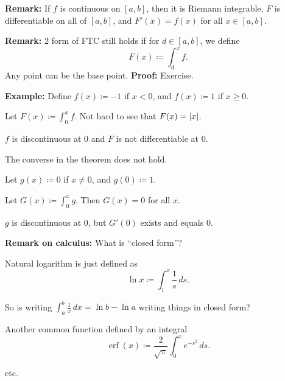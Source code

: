\documentclass[10pt,aspectratio=169]{beamer}
\begin{document}
\begin{frame}

\textbf{Remark:}
If $f$ is continuous on $[a,b]$,
\pause
then it is Riemann integrable,
\pause
$F$ is differentiable on all of $[a,b]$,
\pause
and $F'(x) = f(x)$ for
all $x \in [a,b]$.

\pause
\medskip

\textbf{Remark:}
2 form of FTC still holds if for
$d \in [a,b]$, we define
\begin{equation*}
F(x) \coloneqq \int_d^x f .
\end{equation*}
\pause
Any point can be the base point.
\pause
\textbf{Proof:} Exercise.

\pause
\medskip

\textbf{Example:}
Define $f(x) \coloneqq -1$ if $x
< 0$, and $f(x) \coloneqq 1$ if $x \geq 0$.

\pause
Let $F(x) \coloneqq \int_0^x f$.
\pause
\qquad Not hard to see that $F(x) = \left\lvert {x} \right\rvert$.

\pause
$f$ is discontinuous at $0$ and $F$ is not differentiable at $0$.

\pause
\medskip

The converse in the theorem does not hold.

\pause
Let $g(x) \coloneqq 0$ if $x \not= 0$, and $g(0) \coloneqq 1$.

\pause
Let $G(x) \coloneqq \int_0^x g$. \qquad
\pause
Then $G(x) = 0$ for all $x$.

\pause
$g$ is discontinuous at $0$, but $G'(0)$ exists and equals 0.

\end{frame}

\begin{frame}

\textbf{Remark on calculus:}
What is ``closed form''?

\pause
\medskip

Natural logarithm is just defined as
\begin{equation*}
\ln x \coloneqq \int_1^x \frac{1}{s}\,ds .
\end{equation*}

\pause
So is writing $\int_a^b \frac{1}{x} \,dx = \ln b-\ln a$ writing things in
closed form?

\pause
\medskip

Another common function defined by an integral
\begin{equation*}
\operatorname{erf}(x) \coloneqq \frac{2}{\sqrt{\pi}} \int_0^x e^{-s^2} \,ds .
\end{equation*}

\pause
\medskip

etc.

\end{frame}
\end{document}

